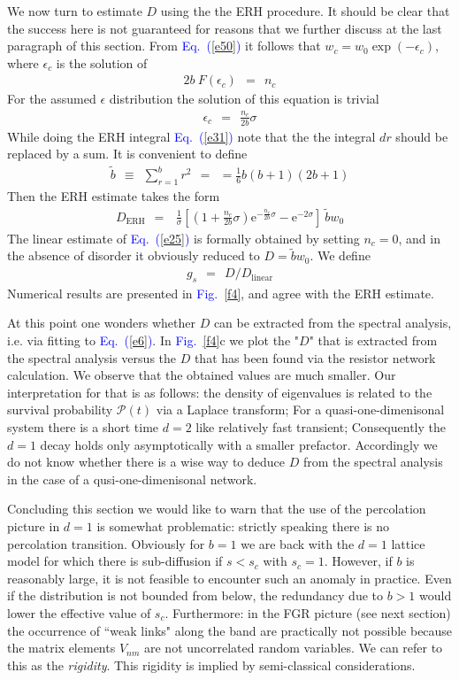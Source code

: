 \documentclass[aps,prb,floats,floatfix,twocolumn]{revtex4}
\newcommand{\eexp}{\mbox{e}^}
\newcommand{\beq}{\begin{eqnarray}}
\newcommand{\eeq}{\end{eqnarray}}
\newcommand{\Eq}[1]{\textcolor{blue}{Eq.\!\!~(\ref{#1})}}
\newcommand{\Fig}[1]{\textcolor{blue}{Fig.}\!\!~\ref{#1}}
\begin{document}
We now turn to estimate $D$ using the 
the ERH procedure. It should be clear that the 
success here is not guaranteed for reasons 
that we further discuss at the last paragraph
of this section.
%  
From \Eq{e50} it follows that ${w_c=w_0\exp(-\epsilon_c)}$, 
where $\epsilon_c$ is the solution of 
%
\beq
2b \ F\left( \epsilon_c \right) \ \ = \ \ n_c
\eeq
%
For the assumed $\epsilon$ distribution the 
solution of this equation is trivial 
%
\beq
\epsilon_c \ \ = \ \ \frac{n_c}{2b}\sigma
\eeq
%
While doing the ERH integral \Eq{e31} note that the 
the integral $dr$ should be replaced by a sum.
It is convenient to define
%
\beq
\tilde{b} \ \ \equiv \ \ \sum_{r=1}^b r^2 \ \ = \ \ = \frac{1}{6}b(b+1)(2b+1)
\eeq
%
Then the ERH estimate takes the form
%
\beq
D_{\text{ERH}} \ \ = \ \ 
\ \frac{1}{\sigma}\left[ 
\left(1+\frac{n_c}{2b}\sigma\right)\eexp{-\frac{n_c}{2b}\sigma} - \eexp{-2\sigma}
\right] \ \tilde{b} w_0
\eeq 
% 
The linear estimate of \Eq{e25} is formally obtained 
by setting ${n_c=0}$, and in the absence 
of disorder it obviously reduced to $D=\tilde{b} w_0$. 
We define 
%
\beq
g_s \ \ = \ \ D/D_{\text{linear}}
\eeq
%
Numerical results are presented in \Fig{f4}, 
and agree with the ERH estimate.

At this point one wonders whether $D$ can be extracted 
from the spectral analysis, i.e. via fitting to \Eq{e6}.
In \Fig{f4}c we plot the "$D$" that is extracted 
from the spectral analysis versus the $D$ that  
has been found via the resistor network calculation.
We observe that the obtained values are much smaller.
Our interpretation for that is as follows: 
the density of eigenvalues is related to the survival 
probability $\mathcal{P}(t)$ via a Laplace transform;  
For a quasi-one-dimenisonal system there is a short time $d{=}2$ like 
relatively fast transient; Consequently the $d{=}1$ decay 
holds only asymptotically with a smaller prefactor.  
Accordingly we do not know whether there is a wise 
way to deduce $D$ from the spectral analysis in the 
case of a qusi-one-dimenisonal network.

Concluding this section we would like to warn 
that the use of the percolation picture in $d{=}1$ is 
somewhat problematic: strictly speaking  
there is no percolation transition. Obviously 
for ${b=1}$ we are back with the $d{=}1$ lattice model 
for which there is sub-diffusion if ${s<s_c}$ 
with ${s_c=1}$. However, if $b$ is reasonably large, 
it is not feasible to encounter such an anomaly 
in practice. Even if the distribution is not bounded 
from below, the redundancy due to ${b>1}$ 
would lower the effective value of $s_c$. 
Furthermore: in the FGR picture (see next section) 
the occurrence of ``weak links" along the band  
are practically not possible because the matrix elements $V_{nm}$ 
are not uncorrelated random variables. 
We can refer to this as the {\em rigidity}.
This rigidity is implied by semi-classical considerations. 
\end{document}
